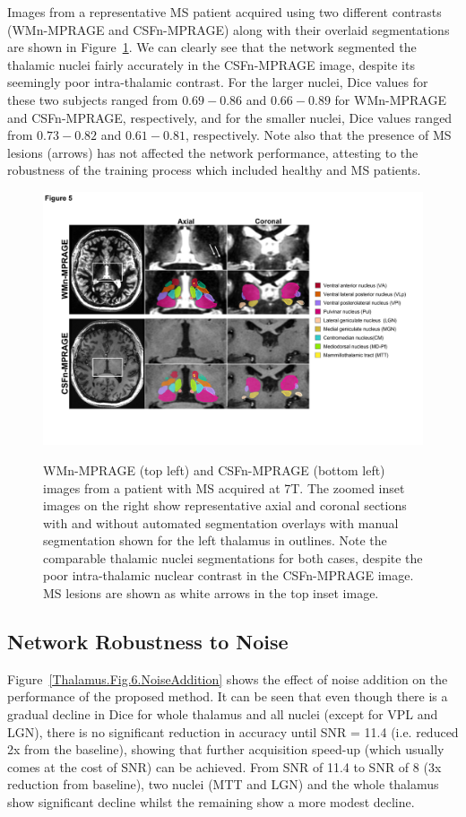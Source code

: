Images from a representative MS patient acquired using two different contrasts (WMn-MPRAGE and CSFn-MPRAGE) along with their overlaid segmentations are shown in Figure~\ref{Thalamus.Fig.3.MS}. We can clearly see that the network segmented the thalamic nuclei fairly accurately in the CSFn-MPRAGE image, despite its seemingly poor intra-thalamic contrast. For the larger nuclei, Dice values for these two subjects ranged from $0.69-0.86$ and $0.66-0.89$ for WMn-MPRAGE and CSFn-MPRAGE, respectively, and for the smaller nuclei, Dice values ranged from $0.73-0.82$ and $0.61-0.81$, respectively. Note also that the presence of MS lesions (arrows) has not affected the network performance, attesting to the robustness of the training process which included healthy and MS patients.

\begin{figure}[!htbp]
\centering \includegraphics[width=\textwidth]{figures/pdf/slide5.pdf}\label{Thalamus.Fig.3.MS}
\caption{WMn-MPRAGE (top left) and CSFn-MPRAGE (bottom left) images from a patient with MS acquired at 7T. The zoomed inset images on the right show representative axial and coronal sections with and without automated segmentation overlays with manual segmentation shown for the left thalamus in outlines. Note the comparable thalamic nuclei segmentations for both cases, despite the poor intra-thalamic nuclear contrast in the CSFn-MPRAGE image. MS lesions are shown as white arrows in the top inset image.}
\end{figure}


\subsection{Network Robustness to Noise}
Figure~\ref{Thalamus.Fig.6.NoiseAddition}  shows the effect of noise addition on the performance of the proposed method. It can be seen that even though there is a gradual decline in Dice for whole thalamus and all nuclei (except for VPL and LGN), there is no significant reduction in accuracy until SNR = 11.4 (i.e. reduced 2x from the baseline), showing that further acquisition speed-up (which usually comes at the cost of SNR) can be achieved. From SNR of 11.4 to SNR of 8 (3x reduction from baseline), two nuclei (MTT and LGN) and the whole thalamus show significant decline whilst the remaining show a more modest decline.

